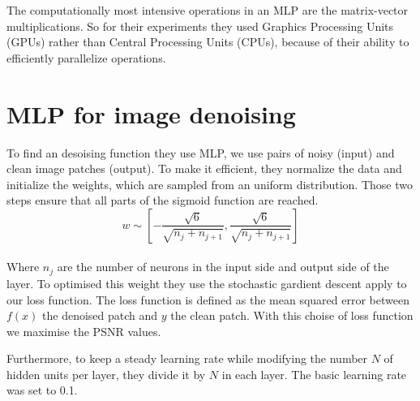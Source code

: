 \documentclass[10pt,a4paper]{article}
\newcommand{\svs}{\vspace{9pt}}
\begin{document}

\svs 

The computationally most intensive operations in an MLP are the matrix-vector multiplications. So for their experiments they used Graphics Processing Units (GPUs) rather than Central Processing Units (CPUs), because of their ability to efficiently parallelize operations.


\svs







\section{MLP for image denoising}


To find an desoising function they use MLP, we use pairs of noisy (input) and clean image patches (output). To make it efficient, they normalize the data and initialize the weights, which are sampled from an uniform distribution. Those two steps ensure that all parts of the sigmoid function are reached. \\%
$$w \sim [-\frac{\sqrt{6}}{\sqrt{n_j + n_{j+1}}}, \frac{\sqrt{6}}{\sqrt{n_j + n_{j+1}}} ]$$ \\
Where $n_j$ are the number of neurons in the input side and output side of the layer. To optimised this weight they use the stochastic gardient descent apply to our loss function. The loss function is defined as the mean squared error between $f(x)$ the denoised patch and $y$ the clean patch. With this choise of loss function we maximise the PSNR values. %


\svs


\svs

Furthermore, to keep a steady learning rate while modifying the number $N$ of hidden units per layer, they divide it by $N$ in each layer. The basic learning rate was set to 0.1. 

\svs
\end{document}
